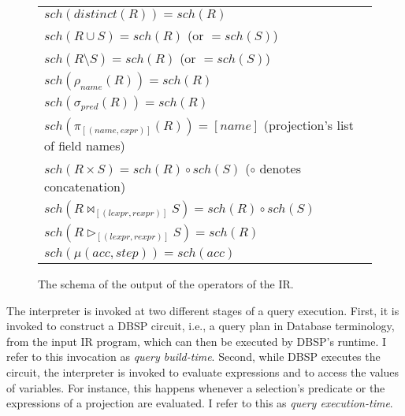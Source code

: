 \begin{figure}[htpb]
	\centering
	\begin{tabular}{@{}l@{}}
		\toprule
		\(\mathit{sch}(\mathit{distinct}(R)) = \mathit{sch}(R)\)                                                   \\
		\(\mathit{sch}(R \cup S) = \mathit{sch}(R)\) (or \(= \mathit{sch}(S)\))                                    \\
		\(\mathit{sch}(R \setminus S) = \mathit{sch}(R)\) (or \(= \mathit{sch}(S)\))                               \\
		\(\mathit{sch}(\rho_{\mathit{name}}(R)) = \mathit{sch}(R)\)                                                \\
		\(\mathit{sch}(\sigma_{\mathit{pred}}(R)) = \mathit{sch}(R)\)                                              \\
		\(\mathit{sch}(\pi_{[(\mathit{name},\mathit{expr})]}(R)) = [name]\) (projection's list of field names)     \\
		\(\mathit{sch}(R \times S) = \mathit{sch}(R) \circ \mathit{sch}(S)\) (\(\circ\) denotes concatenation)     \\
		\(\mathit{sch}(R \bowtie_{[(\mathit{lexpr}, \mathit{rexpr})]} S) = \mathit{sch}(R) \circ \mathit{sch}(S)\) \\
		\(\mathit{sch}(R \triangleright_{[(\mathit{lexpr}, \mathit{rexpr})]} S) = \mathit{sch}(R) \)               \\
		\(\mathit{sch}(\mu(\mathit{acc}, \mathit{step})) = \mathit{sch}(\mathit{acc})\)                            \\
		\bottomrule
	\end{tabular}
	\caption{The schema of the output of the operators of the \ac{IR}.}\label{tab:ir-schema-operators}
\end{figure}

The interpreter is invoked at two different stages of a query execution.
First, it is invoked to construct a DBSP circuit, i.e., a query plan in
Database terminology, from the input \ac{IR} program, which can then be
executed by DBSP's runtime. I refer to this invocation as \emph{query build-time}.
Second, while DBSP executes the circuit, the interpreter is invoked to
evaluate expressions and to access the values of variables. For instance,
this happens whenever a selection's predicate or the expressions of a projection
are evaluated. I refer to this as \emph{query execution-time}.



